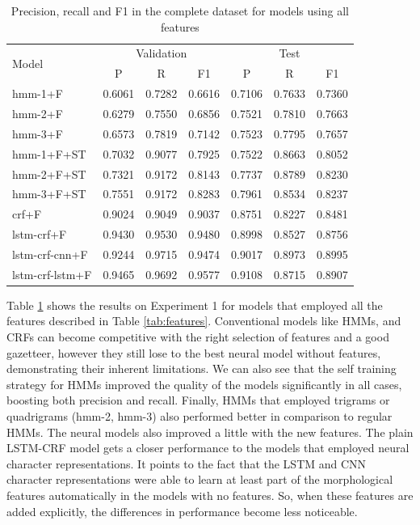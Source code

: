 \documentclass{nle}
\begin{document}
\begin{table}[h]
  \small
  \begin{center}
    \begin{tabular}{ lllllll }
      \toprule
      \multirow{2}{*}{Model} & \multicolumn{3}{c}{Validation} & \multicolumn{3}{c}{Test} \\
                             & \multicolumn{1}{c}{P} & \multicolumn{1}{c}{R} & \multicolumn{1}{c}{F1}
                             & \multicolumn{1}{c}{P} & \multicolumn{1}{c}{R} & \multicolumn{1}{c}{F1} \\
      \midrule
      hmm-1+F	      & 0.6061 & 0.7282 & 0.6616 & 0.7106 & 0.7633 & 0.7360 \\
      hmm-2+F	      & 0.6279 & 0.7550 & 0.6856 & 0.7521 & 0.7810 & 0.7663 \\
      hmm-3+F	      & 0.6573 & 0.7819 & 0.7142 & 0.7523 & 0.7795 & 0.7657 \\
      hmm-1+F+ST      & 0.7032 & 0.9077 & 0.7925 & 0.7522 & 0.8663 & 0.8052 \\
      hmm-2+F+ST      & 0.7321 & 0.9172 & 0.8143 & 0.7737 & 0.8789 & 0.8230 \\
      hmm-3+F+ST      & 0.7551 & 0.9172 & 0.8283 & 0.7961 & 0.8534 & 0.8237 \\
      crf+F	      & 0.9024 & 0.9049 & 0.9037 & 0.8751 & 0.8227 & 0.8481 \\
      lstm-crf+F      & 0.9430 & 0.9530 & 0.9480 & 0.8998 & 0.8527 & 0.8756 \\
      lstm-crf-cnn+F  & 0.9244 & 0.9715 & 0.9474 & 0.9017 & 0.8973 & 0.8995 \\
      lstm-crf-lstm+F & 0.9465 & 0.9692 & 0.9577 & 0.9108 & 0.8715 & 0.8907 \\
      \bottomrule
    \end{tabular}
  \end{center}
  \caption{Precision, recall and F1 in the complete dataset for models using all features}
  \label{tab:experiment1f}
\end{table}

Table \ref{tab:experiment1f} shows the results on Experiment 1 for models
that employed all the features described in Table \ref{tab:features}.
Conventional models like HMMs, and CRFs can become competitive with
the right selection of features and a good gazetteer, however they still lose
to the best neural model without features, demonstrating their inherent limitations.
We can also see that the self training strategy for HMMs improved the quality of 
the models significantly in all cases, boosting both precision and recall. Finally,
HMMs that employed trigrams or quadrigrams (hmm-2, hmm-3) also performed better in
comparison to regular HMMs.
The neural models also improved a little with the new features. The plain LSTM-CRF
model gets a closer performance to the models that employed neural character 
representations. It points to the fact that the LSTM and CNN character representations 
were able to learn at least part of the morphological features automatically in the
models with no features. So, when these features are added explicitly, the differences 
in performance become less noticeable.
\end{document}
